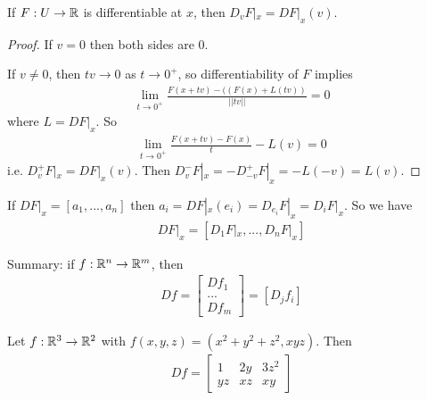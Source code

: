 \documentclass[a4paper]{article}
\begin{document}
\begin{prop}
If $F: U \to \mathbb{R}$ is differentiable at $x$, then $D_v F|_x = DF|_x(v)$.
\begin{proof}
If $v=0$ then both sides are $0$.

If $v \neq 0$, then $tv \to 0$ as $t \to 0^+$, so differentiability of $F$ implies
\begin{equation*}
\begin{aligned}
\lim_{t \to 0^+} \frac{F(x+tv)-((F(x)+L(tv))}{||tv||} = 0
\end{aligned}
\end{equation*}
where $L=DF|_{x}$. So
\begin{equation*}
\begin{aligned}
\lim_{t\to 0^+}\frac{F(x+tv)-F(x)}{t} - L(v) = 0
\end{aligned}
\end{equation*}
i.e. $D_v^+ F|_x = DF|_x(v)$. Then $D_v^-F|_x = -D_{-v}^+ F|_x = -L(-v)=L(v)$.
\end{proof}
\end{prop}

If $DF|_x = [a_1,...,a_n]$ then $a_i = DF|_x(e_i) = D_{e_i} F|_x = D_i F|_x$. So we have
\begin{equation*}
\begin{aligned}
DF|_x = [D_1F|_x,...,D_n F|_x]
\end{aligned}
\end{equation*}

Summary: if $f:\mathbb{R}^n \to \mathbb{R}^m$, then
\begin{equation*}
\begin{aligned}
Df = \left[\begin{array}{ll}
Df_1\\
...\\
Df_m
\end{array}\right]=[D_jf_i]
\end{aligned}
\end{equation*}

\begin{eg}
Let $f:\mathbb{R}^3 \to \mathbb{R}^2$ with $f(x,y,z)=(x^2+y^2+z^2,xyz)$. Then
\begin{equation*}
\begin{aligned}
Df = \left[\begin{matrix}
1 & 2y & 3z^2\\
yz & xz & xy
\end{matrix}\right]
\end{aligned}
\end{equation*}
\end{eg}
\end{document}

